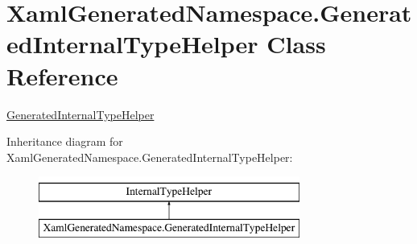 \hypertarget{class_xaml_generated_namespace_1_1_generated_internal_type_helper}{}\section{Xaml\+Generated\+Namespace.\+Generated\+Internal\+Type\+Helper Class Reference}
\label{class_xaml_generated_namespace_1_1_generated_internal_type_helper}


\hyperlink{class_xaml_generated_namespace_1_1_generated_internal_type_helper}{Generated\+Internal\+Type\+Helper}  


Inheritance diagram for Xaml\+Generated\+Namespace.\+Generated\+Internal\+Type\+Helper\+:\begin{figure}[H]
\begin{center}
\leavevmode
\includegraphics[height=2.000000cm]{class_xaml_generated_namespace_1_1_generated_internal_type_helper}
\end{center}
\end{figure}
